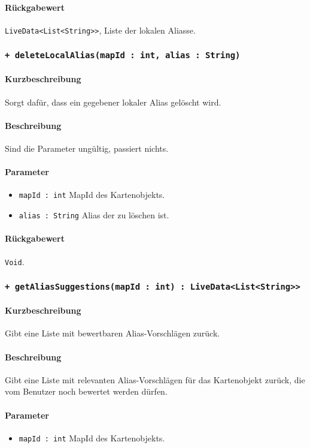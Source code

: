 \paragraph*{Rückgabewert}
\texttt{LiveData<List<String>>}, Liste der lokalen Aliasse.

\subsubsection*{\texttt{+ deleteLocalAlias(mapId : int, alias : String)}}%
\paragraph*{Kurzbeschreibung}
Sorgt dafür, dass ein gegebener lokaler Alias gelöscht wird.
\paragraph*{Beschreibung}
Sind die Parameter ungültig, passiert nichts.
\paragraph*{Parameter}
\begin{itemize}
    \item \texttt{mapId : int} MapId des Kartenobjekts.
    \item \texttt{alias : String} Alias der zu löschen ist.
\end{itemize}
\paragraph*{Rückgabewert}
\texttt{Void}.

\subsubsection*{\texttt{+ getAliasSuggestions(mapId : int) : LiveData<List<String>>}}%
\paragraph*{Kurzbeschreibung}
Gibt eine Liste mit bewertbaren Alias-Vorschlägen zurück.
\paragraph*{Beschreibung}
Gibt eine Liste mit relevanten Alias-Vorschlägen für das Kartenobjekt zurück, 
die vom Benutzer noch bewertet werden dürfen.
\paragraph*{Parameter}
\begin{itemize}
    \item \texttt{mapId : int} MapId des Kartenobjekts.
\end{itemize}
